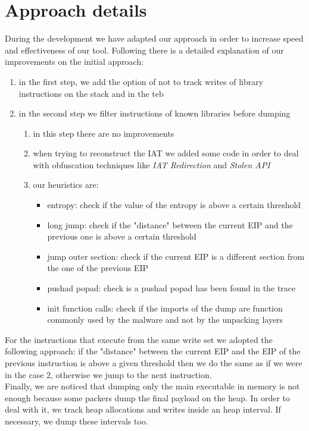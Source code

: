 \section{Approach details}
During the development we have adapted our approach in order to increase speed and effectiveness of our tool. Following there is a detailed explanation of our improvements on the initial approach:
\begin{enumerate}
\item in the first step, we add the option of not to track writes of library instructions on the stack and in the teb
\item in the second step we filter instructions of known libraries before dumping
	\begin{enumerate}
	\item in this step there are no improvements
	\item when trying to reconstruct the IAT we added some code in order to deal with 			obfuscation techniques like \textit{IAT Redirection} and \textit{Stolen API}
	\item our heuristics are:
		\begin{itemize}
		\item entropy: check if the value of the entropy is above a certain threshold
		\item long jump: check if the "distance" between the current EIP and the previous 			one is above a certain threshold
		\item jump outer section: check if the current EIP is a different section from the 		one of the previous EIP
		\item pushad popad: check is a pushad popad has been found in the trace
		\item init function calls: check if the imports of the dump are function commonly 			 used by the malware and not by the unpacking layers
		\end{itemize}
	\end{enumerate}
\end{enumerate} 
For the instructions that execute from the same write set we adopted the following approach: if the "distance" between the current EIP and the EIP of the previous instruction is above a given threshold then we do the same as if we were in the case 2, otherwise we jump to the next instruction.\\
Finally, we are noticed that dumping only the main executable in memory is not enough because some packers dump the final payload on the heap. In order to deal with it, we track heap allocations and writes inside an heap interval. If necessary, we dump these intervals too.
